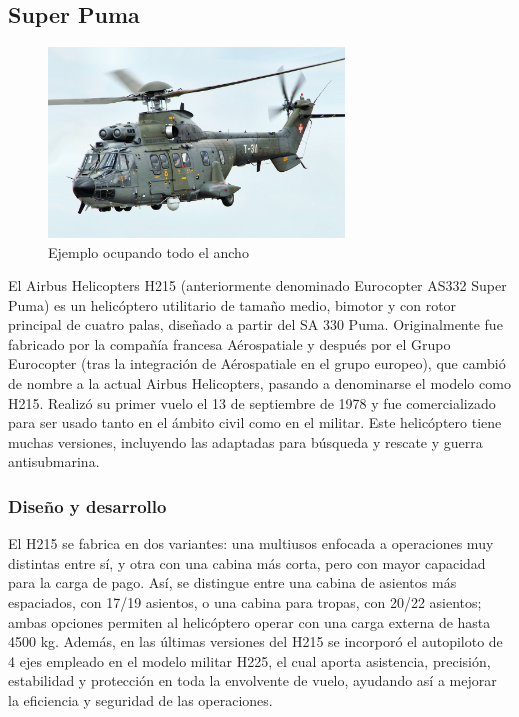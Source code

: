 \subsection{Super Puma}
\begin{figure}[h]
  \centering
  \includegraphics[width=0.7\textwidth]{images/puma.jpg}
  \caption{Ejemplo ocupando todo el ancho}
\end{figure}
El Airbus Helicopters H215 (anteriormente denominado Eurocopter AS332 Super Puma) es un helicóptero utilitario de tamaño medio, bimotor y con rotor principal de cuatro palas, diseñado a partir del SA 330 Puma. Originalmente fue fabricado por la compañía francesa Aérospatiale y después por el Grupo Eurocopter (tras la integración de Aérospatiale en el grupo europeo), que cambió de nombre a la actual Airbus Helicopters, pasando a denominarse el modelo como H215. Realizó su primer vuelo el 13 de septiembre de 1978 y fue comercializado para ser usado tanto en el ámbito civil como en el militar. Este helicóptero tiene muchas versiones, incluyendo las adaptadas para búsqueda y rescate y guerra antisubmarina. 

\subsubsection{Diseño y desarrollo}
El H215 se fabrica en dos variantes: una multiusos enfocada a operaciones muy distintas entre sí, y otra con una cabina más corta, pero con mayor capacidad para la carga de pago. Así, se distingue entre una cabina de asientos más espaciados, con 17/19 asientos, o una cabina para tropas, con 20/22 asientos; ambas opciones permiten al helicóptero operar con una carga externa de hasta 4500 kg. Además, en las últimas versiones del H215 se incorporó el autopiloto de 4 ejes empleado en el modelo militar H225, el cual aporta asistencia, precisión, estabilidad y protección en toda la envolvente de vuelo, ayudando así a mejorar la eficiencia y seguridad de las operaciones.


